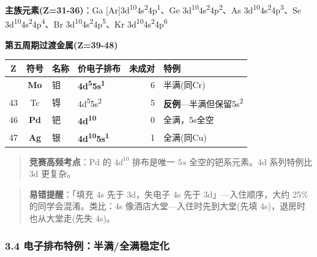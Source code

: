 \documentclass[a4paper,11pt]{ctexart}
\newcounter{none}
\newcommand{\箭}{\ensuremath{\rightarrow}}
\newcommand{\左箭}{\ensuremath{\leftarrow}}
\newcommand{\上箭}{\ensuremath{\uparrow}}
\newcommand{\下箭}{\ensuremath{\downarrow}}
\newcommand{\衡}{\ensuremath{\rightleftharpoons}}
\newcommand{\双箭}{\ensuremath{\leftrightarrow}}
\newcommand{\约等于}{\ensuremath{\approx}}
\newcommand{\小于等于}{\ensuremath{\leq}}
\newcommand{\大于等于}{\ensuremath{\geq}}
\newcommand{\不等于}{\ensuremath{\neq}}
\newcommand{\西格马}{\ensuremath{\sigma}}
\newcommand{\派}{\ensuremath{\pi}}
\begin{document}
\textbf{主族元素(Z=31-36)}：Ga {[}Ar{]}3d\textsuperscript{10}4s\textsuperscript{2}4p\textsuperscript{1}、Ge 3d\textsuperscript{10}4s\textsuperscript{2}4p\textsuperscript{2}、As 3d\textsuperscript{10}4s\textsuperscript{2}4p\textsuperscript{3}、Se 3d\textsuperscript{10}4s\textsuperscript{2}4p\textsuperscript{4}、Br 3d\textsuperscript{10}4s\textsuperscript{2}4p\textsuperscript{5}、Kr 3d\textsuperscript{10}4s\textsuperscript{2}4p\textsuperscript{6}

\textbf{第五周期过渡金属(Z=39-48)}

{\def\LTcaptype{none} %
\begin{longtable}[]{@{}ccllrl@{}}
\toprule\noalign{}
Z & 符号 & 名称 & 价电子排布 & 未成对 & 特例 \\
\midrule\noalign{}
\endhead
\bottomrule\noalign{}
\endlastfoot
42 & \textbf{Mo} & 钼 & \textbf{4d\textsuperscript{5}5s\textsuperscript{1}} & 6 & 半满(同Cr) \\
43 & Tc & 锝 & 4d\textsuperscript{5}5s\textsuperscript{2} & 5 & \textbf{反例}---半满但保留5s\textsuperscript{2} \\
46 & \textbf{Pd} & 钯 & \textbf{4d\textsuperscript{10}} & 0 & 全满，5s全空 \\
47 & \textbf{Ag} & 银 & \textbf{4d\textsuperscript{10}5s\textsuperscript{1}} & 1 & 全满(同Cu) \\
\end{longtable}
}

\begin{quote}
\textbf{竞赛高频考点}：Pd 的 \(4d^{10}\) 排布是唯一 \(5s\) 全空的钯系元素。4d 系列特例比 3d 更复杂。
\end{quote}

\begin{quote}
\textbf{易错提醒}：「填充 4s 先于 3d，失电子 4s 先于 3d」---入住顺序，大约 25\% 的同学会混淆。类比：4s 像酒店大堂---入住时先到大堂(先填 4s)，退房时也从大堂走(先失 4s)。
\end{quote}

\subsubsection{3.4 电子排布特例：半满/全满稳定化}\label{ux7535ux5b50ux6392ux5e03ux7279ux4f8bux534aux6ee1ux5168ux6ee1ux7a33ux5b9aux5316}
\end{document}
